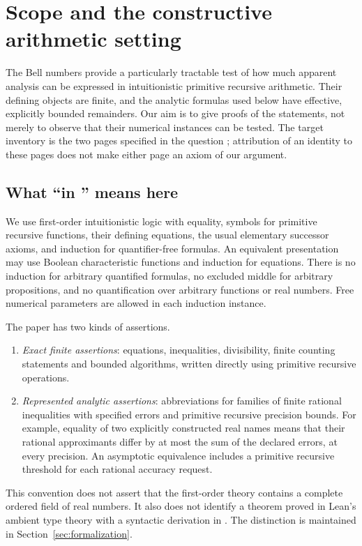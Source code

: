 \section{Scope and the constructive arithmetic setting}\label{sec:foundations}

The Bell numbers provide a particularly tractable test of how much apparent
analysis can be expressed in intuitionistic primitive recursive arithmetic.
Their defining objects are finite, and the analytic formulas used below have
effective, explicitly bounded remainders.  Our aim is to give proofs of the
statements, not merely to observe that their numerical instances can be tested.
The target inventory is the two pages specified in the question
\cite{mathworld,wikipedia}; attribution of an identity to these pages does not
make either page an axiom of our argument.

\subsection{What ``in \ipra'' means here}

We use first-order intuitionistic logic with equality, symbols for primitive
recursive functions, their defining equations, the usual elementary successor
axioms, and induction for quantifier-free formulas.  An equivalent presentation
may use Boolean characteristic functions and induction for equations.  There is
no induction for arbitrary quantified formulas, no excluded middle for
arbitrary propositions, and no quantification over arbitrary functions or real
numbers.  Free numerical parameters are allowed in each induction instance.

The paper has two kinds of assertions.
\begin{enumerate}
\item \emph{Exact finite assertions}: equations, inequalities, divisibility,
finite counting statements and bounded algorithms, written directly using
primitive recursive operations.
\item \emph{Represented analytic assertions}: abbreviations for families of
finite rational inequalities with specified errors and primitive recursive
precision bounds.  For example, equality of two explicitly constructed real
names means that their rational approximants differ by at most the sum of the
declared errors, at every precision.  An asymptotic equivalence includes a
primitive recursive threshold for each rational accuracy request.
\end{enumerate}
This convention does not assert that the first-order theory contains a complete
ordered field of real numbers.  It also does not identify a theorem proved in
Lean's ambient type theory with a syntactic derivation in \ipra.  The distinction
is maintained in Section~\ref{sec:formalization}.

